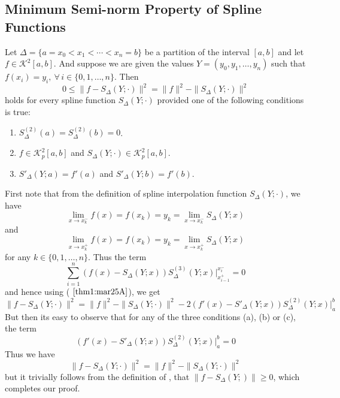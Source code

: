 \subsection{Minimum Semi-norm Property of Spline Functions}

\begin{thm}\label{thm2:mar25A}
    Let $ \Delta = \{ a = x_0 < x_1 < \cdots < x_n = b \} $
    be a partition of the interval $[a,b]$ and let $f \in \mathcal{K}^2[a,b]$. And suppose we are given the values $Y = (y_0, y_1, \dots, y_n)$ such that $f(x_i) = y_i, \ \forall \, i \in \{0,1,\dots,n\}$. Then
    \[
        0 \leq \| f - S_{\Delta}(Y; \cdot) \|^2 = \|f\|^2 - \| S_{\Delta}(Y; \cdot) \|^2    
    \]
    holds for every spline function $S_{\Delta}(Y; \cdot)$ provided one of the following conditions is true:
    \begin{enumerate}[label = (\alph*)]
        \item $S_{\Delta}^{(2)}(a) = S_{\Delta}^{(2)}(b) = 0 $.
        
        \item $f \in \mathcal{K}_p^2[a,b]$ and $S_{\Delta}(Y; \cdot) \in \mathcal{K}^2_p[a,b]$.
        
        \item $S'_{\Delta}(Y;a) = f'(a)$ and $S'_{\Delta}(Y;b) = f'(b)$. 
    \end{enumerate}
\end{thm}

\begin{prf}
    First note that from the definition of spline interpolation function $S_{\Delta}(Y; \cdot)$, we have 
    \[
        \lim_{x \to x_k^-} f(x) = f(x_k) = y_k = \lim_{x \to x_k^-} S_{\Delta}(Y;x)  
    \]
    and 
    \[
        \lim_{x \to x_k^+} f(x) = f(x_k) = y_k = \lim_{x \to x_k^+} S_{\Delta}(Y;x)
    \]
    for any $k \in \{0,1,\dots,n\}$. Thus the term 
    \[
        \sum_{i=1}^n \left(f(x) - S_{\Delta}(Y;x)\right) S_{\Delta}^{(3)}(Y;x) \Big\vert_{x_{i-1}^+}^{x_i^-} = 0  
    \]
    and hence using  ( $\ref{thm1:mar25A}$), we get 
    \begin{equation}\label{eq4:mar25A}
        \| f - S_{\Delta}(Y;\cdot) \|^2 = \|f \|^2 - \| S_{\Delta}(Y;\cdot) \|^2 - 2 \left( f'(x) - S'_{\Delta}(Y;x)\right)S_{\Delta}^{(2)}(Y;x) \Big\vert_a^b
    \end{equation}
    But then its easy to observe that for any of the three conditions (a), (b) or (c), the term 
    \[
        \left( f'(x) - S'_{\Delta}(Y;x)\right)S_{\Delta}^{(2)}(Y;x) \Big\vert_a^b = 0
    \]
    Thus we have 
    \begin{equation}\label{eq5:mar25A}
        \| f - S_{\Delta}(Y; \cdot) \|^2 = \| f \|^2 - \| S_{\Delta}(Y; \cdot) \|^2
    \end{equation}
    but it trivially follows from the definition of , that $\| f - S_{\Delta}(Y;)\| \geq 0$, which completes our proof. 
\end{prf}

